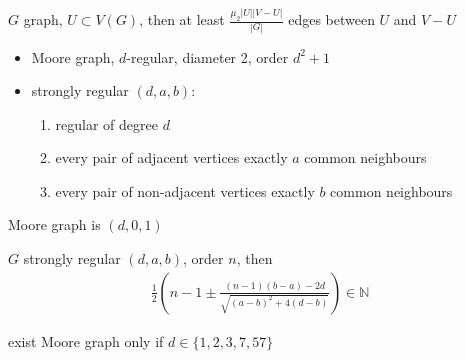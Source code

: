 \begin{thm}
    $G$ graph, $U \subset V(G)$, then at least $\frac{\mu_2|U||V - U|}{|G|}$ edges between $U$ and $V - U$
\end{thm}

\begin{itemize}
    \item Moore graph, $d$-regular, diameter 2, order $d^2 + 1$
    \item strongly regular $(d, a, b)$:
    \begin{enumerate}
        \item regular of degree $d$
        \item every pair of adjacent vertices exactly $a$ common neighbours
        \item every pair of non-adjacent vertices exactly $b$ common neighbours
    \end{enumerate}
\end{itemize}

\begin{fact}
    Moore graph is $(d, 0, 1)$
\end{fact}

\begin{thm}
    $G$ strongly regular $(d, a, b)$, order $n$, then
    \begin{align*}
        \frac{1}{2} \left( n - 1 \pm \frac{(n-1)(b -a) - 2d}{\sqrt{(a - b)^2 + 4(d - b)}} \right) \in \mathbb{N}
    \end{align*}
\end{thm}

\begin{thm}
    exist Moore graph only if $d \in \{1,2,3,7,57\}$
\end{thm}